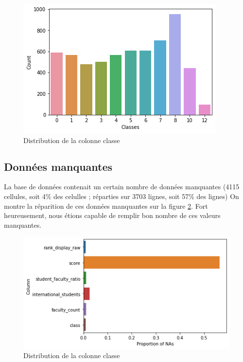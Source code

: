 \documentclass[twocolumns]{udes_rapport}
\begin{document}
        \begin{figure}[h!]
            \centering
            \includegraphics[scale=0.5]{Images/classe_distribution.png}
            \caption{Distribution de la colonne \textsf{classe}}
            \label{fig:classe_distrib}
        \end{figure}
    
    \subsection{Données manquantes}\label{subsec:missing_values}
    
        La base de données contenait un certain nombre de données manquantes (4115 cellules, soit 4\% des celulles ; réparties sur 3703 lignes, soit 57\% des lignes) On montre la réparition de ces données manquantes sur la figure \ref{fig:na_prop}. Fort heureusement, nous étions capable de remplir bon nombre de ces valeurs manquantes.
    
        \begin{figure}[h!]
            \centering
            \includegraphics[scale=0.5]{Images/na_proportion.png}
            \caption{Distribution de la colonne \textsf{classe}}
            \label{fig:na_prop}
        \end{figure}
        
\end{document}
